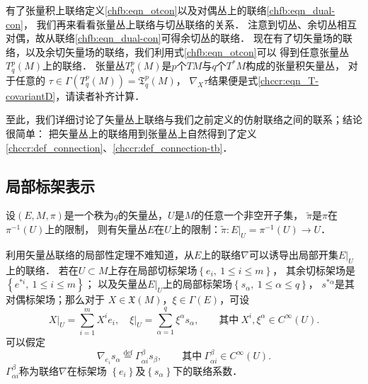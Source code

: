 有了张量积上联络定义\eqref{chfb:eqn_otcon}以及对偶丛上的联络\eqref{chfb:eqn_dual-con}，
我们再来看看张量丛上联络与切丛联络的关系．
注意到切丛、余切丛相互对偶，故从联络\eqref{chfb:eqn_dual-con}可得余切丛的联络．
现在有了切矢量场的联络，以及余切矢量场的联络，我们利用式\eqref{chfb:eqn_otcon}可以
得到任意张量丛 $T_q^p(M)$上的联络．
张量丛$T_q^p(M)$是$p$个$TM$与$q$个$T^* M$构成的张量积矢量丛，
对于任意的 $\tau \in \Gamma (T_q^p(M)) =\mathfrak{T}_q^p(M)$，
$\nabla_X \tau$结果便是式\eqref{chccr:eqn_T-covariantD}，请读者补齐计算．


至此，我们详细讨论了矢量丛上联络与我们之前定义的仿射联络之间的联系；结论很简单：
把矢量丛上的联络用到张量丛上自然得到了定义\ref{chccr:def_connection}、\ref{chccr:def_connection-tb}．


\subsection{局部标架表示}\label{chfb:sec_vc}

设$(E,M,\pi)$是一个秩为$q$的矢量丛，$U$是$M$的任意一个非空开子集，
$\tilde{\pi}$是$\pi$在 $\pi^{-1}(U)$上的限制，
则有矢量丛$E$在$U$上的限制：$\tilde{\pi}:\left.E\right|_U=\pi^{-1}(U) \to U$．

利用矢量丛联络的局部性定理不难知道，从$E$上的联络$\nabla$可以诱导出局部开集$\left.E\right|_U$上的联络．
若在$U\subset M$上存在局部切标架场$\left\{e_i,\ 1 \leqslant i \leqslant m\right\}$，
其余切标架场是$\left\{e^{*i},\ 1 \leqslant i \leqslant m\right\}$；
以及矢量丛$\left.E\right|_U$上的局部标架场$\left\{s_\alpha,\ 1 \leqslant \alpha \leqslant q\right\}$，
$s^{*\alpha}$是其对偶标架场；那么对于 $X \in \mathfrak{X}(M)$，$ \xi \in \Gamma(E)$，可设
\begin{equation*}
    \left.X\right|_U= \sum_{i=1}^{m}X^i e_i,\left.\quad 
    \xi\right|_U= \sum_{\alpha=1}^{q}\xi^\alpha s_\alpha,
    \qquad \text{其中} \  X^i, \xi^\alpha \in C^{\infty}(U) .
\end{equation*}
可以假定
\begin{equation}\label{chfb:eqn_con-Gamma}
    \nabla_{e_i} s_\alpha \overset{\mathrm {def}}{=} \Gamma_{\alpha i}^\beta s_\beta,
    \qquad \text{其中}\  \Gamma_{\alpha i}^\beta \in C^{\infty}(U). 
\end{equation}
$\Gamma_{\alpha i}^\beta$称为联络$\nabla$在标架场
$\left\{e_i\right\}$及$\left\{s_\alpha\right\}$下的{\heiti 联络系数}． 

